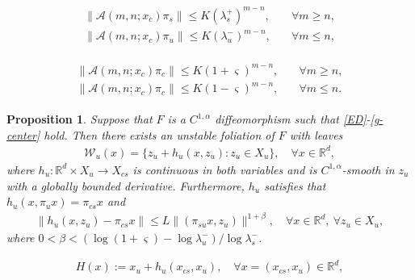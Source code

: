 \documentclass[10pt,a4paper]{amsart}
\newtheorem{proposition}{Proposition}
\begin{document}
\begin{align}\label{ED}
\begin{split}
\|\mathcal{A}(m,n;x_c)\pi_s\| \le K (\lambda_s^+)^{m-n}, \quad & \forall m\ge n,
\\
\|\mathcal{A}(m,n;x_c)\pi_u\| \le K (\lambda_u^-)^{m-n}, \quad & \forall m\le n,
\end{split}
\end{align}

\begin{align}\label{g-center}
\begin{split}
 \|\mathcal{A}(m,n;x_c)\pi_c\| \le K (1+\varsigma)^{m-n}, \quad & \forall m\ge n,
\\
\|\mathcal{A}(m,n;x_c)\pi_c\| \le K (1-\varsigma)^{m-n}, \quad & \forall m\le n.
\end{split}
\end{align}

\begin{proposition}\label{Fol-thm}
Suppose that $F$ is a $C^{1,\alpha}$ diffeomorphism
 such that \eqref{ED}-\eqref{g-center} hold.
Then there exists an unstable foliation of $F$ with leaves
\begin{align}\label{unst-foli}
\mathcal{W}_u(x)=\{z_u+h_u(x,z_u): z_u\in X_u \},\quad \forall x\in\mathbb{R}^d,
\end{align}
where $h_u: \mathbb{R}^d \times X_u \to X_{cs}$ is continuous in both variables and is $C^{1,\alpha}$-smooth in $z_u$ with a globally bounded derivative.
Furthermore, $h_u$ satisfies that $h_u(x,\pi_u x)=\pi_{cs} x$ and
\begin{align}\label{hh-u}
\|h_u(x,z_u)-\pi_{cs}x\|
\le L\|(\pi_{su} x,z_u)\|^{1+\beta},\quad \forall x\in \mathbb{R}^d,~\forall z_u\in X_u,
\end{align}
where $0< \beta<(\log(1+\varsigma)-\log\lambda_u^-)/\log\lambda_s^-$.
\end{proposition}

\begin{align}\label{Dec-1}
H(x):=x_u+ h_u(x_{cs}, x_u), \quad \forall x=(x_{cs},x_u)\in\mathbb{R}^d,
\end{align}
\end{document}
